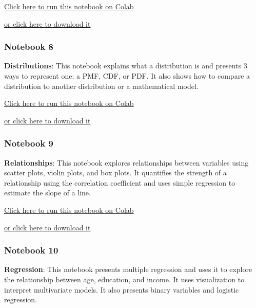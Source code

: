 \href{https://colab.research.google.com/github/AllenDowney/ElementsOfDataScience/blob/master/07_dataframes.ipynb}{Click
here to run this notebook on Colab}

\href{https://github.com/AllenDowney/ElementsOfDataScience/raw/master/07_dataframes.ipynb}{or
click here to download it}

\hypertarget{notebook-8}{%
\subsubsection{Notebook 8}\label{notebook-8}}

\textbf{Distributions}: This notebook explains what a distribution is
and presents 3 ways to represent one: a PMF, CDF, or PDF. It also shows
how to compare a distribution to another distribution or a mathematical
model.

\href{https://colab.research.google.com/github/AllenDowney/ElementsOfDataScience/blob/master/08_distributions.ipynb}{Click
here to run this notebook on Colab}

\href{https://github.com/AllenDowney/ElementsOfDataScience/raw/master/08_distributions.ipynb}{or
click here to download it}

\hypertarget{notebook-9}{%
\subsubsection{Notebook 9}\label{notebook-9}}

\textbf{Relationships}: This notebook explores relationships between
variables using scatter plots, violin plots, and box plots. It
quantifies the strength of a relationship using the correlation
coefficient and uses simple regression to estimate the slope of a line.

\href{https://colab.research.google.com/github/AllenDowney/ElementsOfDataScience/blob/master/09_relationships.ipynb}{Click
here to run this notebook on Colab}

\href{https://github.com/AllenDowney/ElementsOfDataScience/raw/master/09_relationships.ipynb}{or
click here to download it}

\hypertarget{notebook-10}{%
\subsubsection{Notebook 10}\label{notebook-10}}

\textbf{Regression}: This notebook presents multiple regression and uses
it to explore the relationship between age, education, and income. It
uses visualization to interpret multivariate models. It also presents
binary variables and logistic regression.

